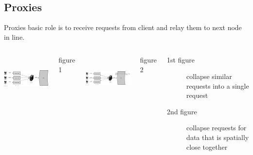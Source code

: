 \documentclass[9pt]{beamer}
\begin{document}
\subsection{Proxies}
\begin{frame}{Proxies}
 basic role is to receive requests from client and relay them to next node in line. 

 \pause
 \begin{columns}
    \includegraphics[width=55mm, height=25mm, scale=0.1]{img/proxy_collapse.png}
    \caption{figure 1}
    \includegraphics[width=55mm, height=25mm, scale=0.1]{img/proxy_collapse_spatial.png}
    \caption{figure 2}

    \begin{description}
    \item[1st figure] collapse similar requests into a single request
    \item[2nd figure] collapse requests for data that is spatially close together
    \end{description}
  \end{columns}
\end{frame}

\end{document}
